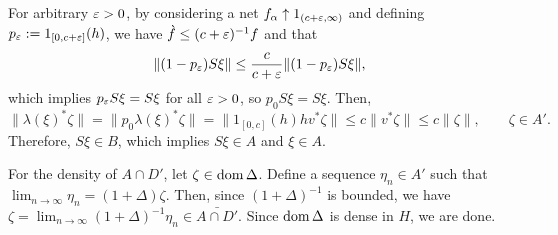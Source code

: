 \documentclass{../../small}
\begin{document}
\begin{pf}
For arbitrary $\varepsilon>0$, by considering a net $f_\alpha\uparrow1_{(c+\varepsilon,\infty)}$ and defining $p_\varepsilon:=1_{[0,c+\varepsilon]}(h)$, we have $\grave f\le(c+\varepsilon)^{-1}f$ and that
\[\|(1-p_\varepsilon)S\xi\|\le\frac c{c+\varepsilon}\|(1-p_\varepsilon)S\xi\|,\]
which implies $p_\varepsilon S\xi=S\xi$ for all $\varepsilon>0$, so $p_0S\xi=S\xi$.
Then,
\[\|\lambda(\xi)^*\zeta\|=\|p_0\lambda(\xi)^*\zeta\|=\|1_{[0,c]}(h)hv^*\zeta\|\le c\|v^*\zeta\|\le c\|\zeta\|,\qquad\zeta\in A'.\]
Therefore, $S\xi\in B$, which implies $S\xi\in A$ and $\xi\in A$.

For the density of $A\cap D'$, let $\zeta\in\operatorname{dom}\Delta$.
Define a sequence $\eta_n\in A'$ such that $\lim_{n\to\infty}\eta_n=(1+\Delta)\zeta$.
Then, since $(1+\Delta)^{-1}$ is bounded, we have $\zeta=\lim_{n\to\infty}(1+\Delta)^{-1}\eta_n\in\bar{A\cap D'}$.
Since $\operatorname{dom}\Delta$ is dense in $H$, we are done.
\end{pf}
\end{document}

